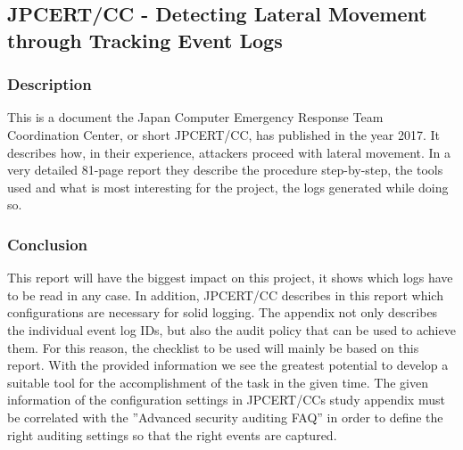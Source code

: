\subsection{JPCERT/CC - Detecting Lateral Movement through Tracking Event Logs}\label{JPCertStudy}
\subsubsection{Description}
This is a document \cite{JPCERTDetectingLateralMovement} the Japan Computer Emergency Response Team Coordination Center, or short JPCERT/CC, has published in the year 2017. It describes how, in their experience, attackers proceed with lateral movement. In a very detailed 81-page report they describe the procedure step-by-step, the tools used and what is most interesting for the project, the logs generated while doing so.
\subsubsection{Conclusion}
This report will have the biggest impact on this project, it shows which logs have to be read in any case. In addition, JPCERT/CC describes in this report which configurations are necessary for solid logging. The appendix not only describes the individual event log IDs, but also the audit policy that can be used to achieve them. For this reason, the checklist to be used will mainly be based on this report. With the provided information we see the greatest potential to develop a suitable tool for the accomplishment of the task in the given time. The given information of the configuration settings in JPCERT/CCs study appendix must be correlated with the ''Advanced security auditing FAQ'' \cite{AdvancedSecurityAuditing} in order to define the right auditing settings so that the right events are captured.


